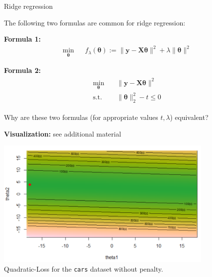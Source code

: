 \documentclass[11pt,compress,t,notes=noshow, xcolor=table]{beamer}
\begin{document}
\begin{vbframe}{Ridge regression}

The following two formulas are common for ridge regression:

\lz
\textbf{Formula 1:}
\begin{eqnarray}
  \min_{\bm{\theta}} && f_\lambda(\bm{\theta}) := \|\bm{y} - \mathbf{X}\bm{\theta}\|^2 + \lambda \|\bm{\theta}\|^2
\label{eq:form1}
\end{eqnarray}

\vspace*{-0.2cm}
\textbf{Formula 2:}
\begin{align}
\begin{split}
\min_{\bm{\theta}} & \quad \|\bm{y} - \mathbf{X}\bm{\theta}\|^2 \\
\text{s.t. } & \quad \|\bm{\theta}\|_2^2 - t \le 0
\end{split}
\label{eq:form2}
\end{align}



Why are these two formulas (for appropriate values $t, \lambda$) equivalent?

\framebreak

\textbf{Visualization:} see additional material

\lz

\begin{center}
\includegraphics[width = 0.8\textwidth]{figure_man/ridge_original.png} \\
Quadratic-Loss for the \texttt{cars} dataset without penalty.
\end{center}

\lz


\end{vbframe}
\end{document}
